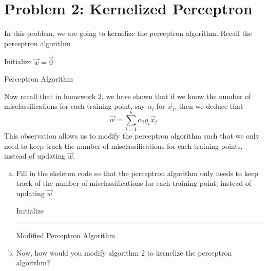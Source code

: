 \documentclass{article}
\begin{document}
	\section*{Problem 2: Kernelized Perceptron}
	In this problem, we are going to kernelize the perceptron algorithm. Recall the perceptron algorithm
	
	\begin{algorithm}[H]
		\SetAlgoLined
		
		Initialize $\vec{w} = \vec{0}$ \;
		\caption{Perceptron Algorithm}
	\end{algorithm}
	\noindent
	Now recall that in homework 2, we have shown that if we know the number of misclassifications for each training point, say $\alpha_i$ for $\vec{x}_i$, then we deduce that 
	$$\vec{w} = \sum_{i=1}^{n} \alpha_i y_i \vec{x}_i$$ This observation allows us to modify the perceptron algorithm such that we only need to keep track the number of misclassifications for each training points, instead of updating $\vec{w}$. 
	\begin{enumerate}[(a)]
		\item Fill in the skeleton code so that the perceptron algorithm only needs to keep track of the number of misclassifications for each training point, instead of updating $\vec{w}$
		
		\begin{algorithm}[H]
			\SetAlgoLined
			
			Initialize \rule{7cm}{0.4pt} \;
			\caption{Modified Perceptron Algorithm}
		\end{algorithm}
		
		\item Now, how would you modify algorithm 2 to kernelize the perceptron algorithm?
	\end{enumerate}
    \newpage
\end{document}
